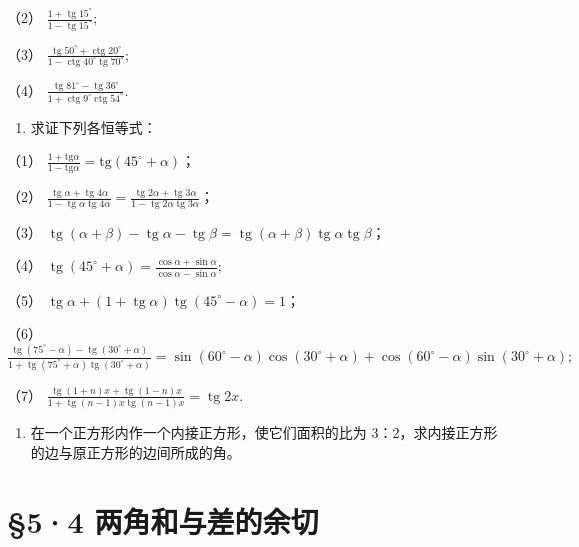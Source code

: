 （2）
\(\frac{1 + \operatorname{tg} 15^{\circ}}{1 - \operatorname{tg} 15^{\circ}};\)

（3）
\(\frac{\operatorname{tg} 50^{\circ} + \operatorname{ctg} 20^{\circ}}{1 - \operatorname{ctg} 40^{\circ} \operatorname{tg} 70^{\circ}};\)

（4）
\(\frac{\operatorname{tg} 81^{\circ} - \operatorname{tg} 36^{\circ}}{1 + \operatorname{ctg} 9^{\circ} \operatorname{ctg} 54^{\circ}}.\)

\begin{enumerate}[start=7]
\item
  求证下列各恒等式：
\end{enumerate}

（1）
\(\frac{1 + \mathrm{tg}\alpha}{1 - \mathrm{tg}\alpha} = \mathrm{tg}(45^{\circ} + \alpha)\)；

（2）
\(\frac{\operatorname{tg} \alpha + \operatorname{tg} 4\alpha}{1 - \operatorname{tg} \alpha \operatorname{tg} 4\alpha} = \frac{\operatorname{tg} 2\alpha + \operatorname{tg} 3\alpha}{1 - \operatorname{tg} 2\alpha \operatorname{tg} 3\alpha}\)；

（3）
\(\operatorname{tg}(\alpha + \beta) - \operatorname{tg} \alpha - \operatorname{tg} \beta = \operatorname{tg}(\alpha + \beta) \operatorname{tg} \alpha \operatorname{tg} \beta\)；

（4）
\(\operatorname{tg}(45^{\circ} + \alpha) = \frac{\cos\alpha + \sin\alpha}{\cos\alpha - \sin\alpha};\)

（5）
\(\operatorname{tg} \alpha + (1 + \operatorname{tg} \alpha) \operatorname{tg}(45^{\circ} - \alpha) = 1\)；

（6）
\(\frac{\operatorname{tg}(75^{\circ} - \alpha) - \operatorname{tg}(30^{\circ} + \alpha)}{1 + \operatorname{tg}(75^{\circ} + \alpha)\operatorname{tg}(30^{\circ} + \alpha)} = \sin (60^{\circ} - \alpha)\cos (30^{\circ} + \alpha) + \cos (60^{\circ} - \alpha)\sin (30^{\circ} + \alpha);\)

（7）
\(\frac{\operatorname{tg}(1 + n)x + \operatorname{tg}(1 - n)x}{1 + \operatorname{tg}(n - 1)x\operatorname{tg}(n - 1)x} = \operatorname{tg}2x.\)

\begin{enumerate}[start=8]
\item
  在一个正方形内作一个内接正方形，使它们面积的比为
  3：2，求内接正方形的边与原正方形的边间所成的角。
\end{enumerate}

\section{§5·4 两角和与差的余切}

